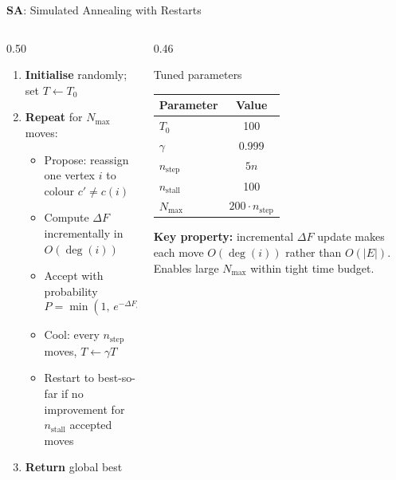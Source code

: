 \documentclass[aspectratio=169,10pt]{beamer}
\newcommand{\col}{c}
\newcommand{\fitF}{F}
\newcommand{\algbox}[2]{\textcolor{#1}{\textbf{#2}}}
\begin{document}
\begin{frame}{\algbox{algacolorsa}{SA}: Simulated Annealing with Restarts}

\begin{columns}[T]
\begin{column}{0.50\textwidth}
\begin{enumerate}
  \item \textbf{Initialise} randomly; set $T \leftarrow T_0$
  \item \textbf{Repeat} for $N_{\max}$ moves:
    \begin{itemize}
      \item Propose: reassign one vertex $i$ to colour $c' \neq \col(i)$
      \item Compute $\Delta\fitF$ incrementally in $O(\deg(i))$
      \item Accept with probability
        \[P = \min\!\left(1,\, e^{-\Delta\fitF / T}\right)\]
      \item Cool: every $n_{\text{step}}$ moves, $T \leftarrow \gamma T$
      \item \alert{Restart} to best-so-far if no improvement for $n_{\text{stall}}$ accepted moves
    \end{itemize}
  \item \textbf{Return} global best
\end{enumerate}
\end{column}

\begin{column}{0.46\textwidth}
\begin{block}{Tuned parameters}
\renewcommand{\arraystretch}{1.1}
\begin{tabular}{lc}
\toprule
Parameter & Value \\
\midrule
$T_0$         & 100 \\
$\gamma$      & 0.999 \\
$n_{\text{step}}$ & $5n$ \\
$n_{\text{stall}}$& 100 \\
$N_{\max}$    & $200 \cdot n_{\text{step}}$ \\
\bottomrule
\end{tabular}
\end{block}

\vspace{0.5em}
\textbf{Key property:} incremental $\Delta\fitF$ update makes each move $O(\deg(i))$ rather than $O(|E|)$.
Enables large $N_{\max}$ within tight time budget.
\end{column}
\end{columns}

\end{frame}
\end{document}
